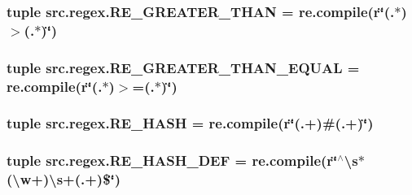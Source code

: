 \hypertarget{namespacesrc_1_1regex_ace242488f0a9e41cfa003b2f3f3f279a}{
\subsubsection[{R\-E\-\_\-\-G\-R\-E\-A\-T\-E\-R\-\_\-\-T\-H\-A\-N}]{\setlength{\rightskip}{0pt plus 5cm}tuple src.\-regex.\-R\-E\-\_\-\-G\-R\-E\-A\-T\-E\-R\-\_\-\-T\-H\-A\-N = re.\-compile(r\char`\"{}(.$\ast$)$>$(.$\ast$)\char`\"{})}}\label{namespacesrc_1_1regex_ace242488f0a9e41cfa003b2f3f3f279a}
\hypertarget{namespacesrc_1_1regex_af312faea51e23c7295397a7eb00fd41d}{
\subsubsection[{R\-E\-\_\-\-G\-R\-E\-A\-T\-E\-R\-\_\-\-T\-H\-A\-N\-\_\-\-E\-Q\-U\-A\-L}]{\setlength{\rightskip}{0pt plus 5cm}tuple src.\-regex.\-R\-E\-\_\-\-G\-R\-E\-A\-T\-E\-R\-\_\-\-T\-H\-A\-N\-\_\-\-E\-Q\-U\-A\-L = re.\-compile(r\char`\"{}(.$\ast$)$>$=(.$\ast$)\char`\"{})}}\label{namespacesrc_1_1regex_af312faea51e23c7295397a7eb00fd41d}
\hypertarget{namespacesrc_1_1regex_acd48c29153f9fd47cbc3794c95937797}{
\subsubsection[{R\-E\-\_\-\-H\-A\-S\-H}]{\setlength{\rightskip}{0pt plus 5cm}tuple src.\-regex.\-R\-E\-\_\-\-H\-A\-S\-H = re.\-compile(r\char`\"{}(.+)\#(.+)\char`\"{})}}\label{namespacesrc_1_1regex_acd48c29153f9fd47cbc3794c95937797}
\hypertarget{namespacesrc_1_1regex_aedef0b43e8edc555d38d4c10fbacf5f7}{
\subsubsection[{R\-E\-\_\-\-H\-A\-S\-H\-\_\-\-D\-E\-F}]{\setlength{\rightskip}{0pt plus 5cm}tuple src.\-regex.\-R\-E\-\_\-\-H\-A\-S\-H\-\_\-\-D\-E\-F = re.\-compile(r\char`\"{}$^\wedge$\textbackslash{}s$\ast$(\textbackslash{}w+)\textbackslash{}s+(.+)\$\char`\"{})}}\label{namespacesrc_1_1regex_aedef0b43e8edc555d38d4c10fbacf5f7}
